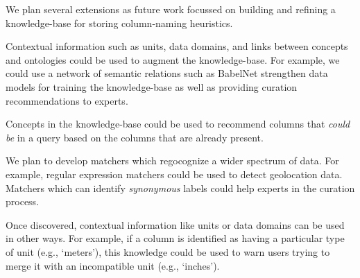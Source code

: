 We plan several extensions as future work focussed on building and refining a knowledge-base for storing column-naming heuristics. 

Contextual information such as units, data domains, and links between concepts and ontologies could be used to augment the \systemname knowledge-base. 
For example, we could use a network of semantic relations such as BabelNet strengthen data models for training the knowledge-base as well as providing curation recommendations to experts.~\cite{babelnet} 

Concepts in the knowledge-base could be used to recommend columns that \textit{could be} in a query based on the columns that are already present.

We plan to develop matchers which regocognize a wider spectrum of data. For example, regular expression matchers could be used to detect geolocation data. Matchers which can identify \textit{synonymous} labels could help experts in the curation process. 

Once discovered, contextual information like units or data domains can be used in other ways.  
For example, if a column is identified as having a particular type of unit (e.g., `meters'), this knowledge could be used to warn users trying to merge it with an incompatible unit (e.g., `inches').  



